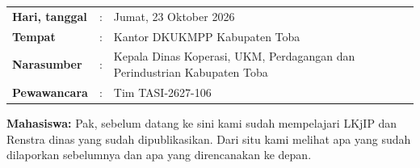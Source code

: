 {\small
\begin{tabular}{@{}l@{\ }l@{\ }p{}@{}}
\textbf{Hari, tanggal} & : & Jumat, 23 Oktober 2026 \\
\textbf{Tempat} & : & Kantor DKUKMPP Kabupaten Toba \\
\textbf{Narasumber} & : & Kepala Dinas Koperasi, UKM, Perdagangan dan Perindustrian Kabupaten Toba \\
\textbf{Pewawancara} & : & Tim TASI-2627-106 \\
\end{tabular}

\vspace{1.2em}

\noindent \textbf{Mahasiswa:} Pak, sebelum datang ke sini kami sudah mempelajari LKjIP dan Renstra dinas yang sudah dipublikasikan. Dari situ kami melihat apa yang sudah dilaporkan sebelumnya dan apa yang direncanakan ke depan.

}
